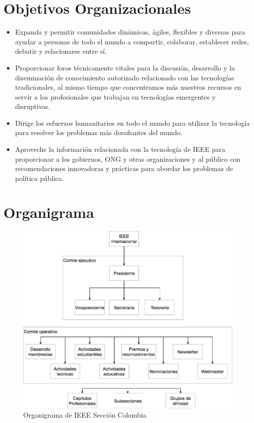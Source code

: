 \section{Objetivos Organizacionales}
\begin{itemize}
	\item  Expanda y permitir comunidades dinámicas, ágiles, flexibles y diversas para ayudar a personas de todo el mundo a compartir, colaborar, establecer redes, debatir y relacionarse entre sí.
	\item Proporcionar foros técnicamente vitales para la discusión, desarrollo y la diseminación de conocimiento autorizado relacionado con las tecnologías tradicionales, al mismo tiempo que concentramos más nuestros recursos en servir a los profesionales que trabajan en tecnologías emergentes y disruptivas.
	\item Dirige los esfuerzos humanitarios en todo el mundo para utilizar la tecnología para resolver los problemas más desafiantes del mundo.
	\item Aproveche la información relacionada con la tecnología de IEEE para proporcionar a los gobiernos, ONG y otras organizaciones y al público con recomendaciones innovadoras y prácticas para abordar los problemas de política pública.
\end{itemize}
\newpage
\section{Organigrama}

\begin{figure}[ht]
	\centering
	\includegraphics[width=1.2\linewidth]{arquitectura_diseno/imgs/organigrama}
	\caption{Organigrama de IEEE Sección Colombia}
	\label{fig:organigrama}
\end{figure}

